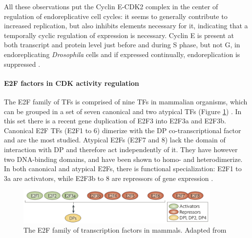 \documentclass[11pt,twoside,a4paper]{report}
\begin{document}
				All these observations put the Cyclin E-CDK2 complex in the center of regulation of endoreplicative cell cycles: it seems to generally contribute to increased replication, but also inhibits elements necessary for it, indicating that a temporally cyclic regulation of expression is necessary. Cyclin E is present at both transcript and protein level just before and during S phase, but not G, in endoreplicating \textit{Drosophila} cells \cite{Weng2003} and if expressed continually, endoreplication is suppressed \cite{Weiss}.
			
				\paragraph{E2F factors in CDK activity regulation}
				\label{paragraph:E2Fs}
				The E2F family of TFs is comprised of nine TFs in mammalian organisms, which can be grouped in a set of seven canonical and two atypical TFs (Figure \ref{fig:E2F_family})  \cite{VandenHeuvel2008}. In this set there is a recent gene duplication of E2F3 into E2F3a and E2F3b. Canonical E2F TFs (E2F1 to 6) dimerize with the DP co-transcriptional factor and are the most studied. Atypical E2Fs (E2F7 and 8) lack the domain of interaction with DP and therefore act independently of it. They have however two DNA-binding domains, and have been shown to homo- and heterodimerize. In both canonical and atypical E2Fs, there is functional specialization: E2F1 to 3a are activators, while E2F3b to 8 are repressors of gene expression  \cite{VandenHeuvel2008}.
				
				\begin{figure}[here]
					\centering
					\includegraphics[width=0.9\textwidth]{pngs/E2F_family.png}
					\caption[The E2F family of transcription factors in mammals]
					{The E2F family of transcription factors in mammals. {\footnotesize Adapted from \cite{VandenHeuvel2008}}}
					\label{fig:E2F_family}
					\vspace{-20pt}
				\end{figure}
				
\end{document}
